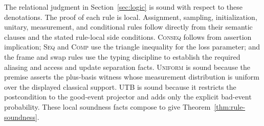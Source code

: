 \documentclass[conference,compsoc]{IEEEtran}
\begin{document}
The relational judgment in Section~\ref{sec:logic} is sound with respect to
these denotations. The proof of each rule is local. Assignment, sampling,
initialization, unitary, measurement, and conditional rules follow directly
from their semantic clauses and the stated rule-local side conditions.
\textsc{Conseq} follows from assertion implication; \textsc{Seq} and
\textsc{Comp} use the triangle inequality for the loss parameter; and the
frame and swap rules use the typing discipline to establish the required
aliasing and access and update separation facts. \textsc{Uniform} is sound because
the premise asserts the plus-basis witness whose measurement distribution is
uniform over the displayed classical support. \textsc{UTB} is sound because it
restricts the postcondition to the good-event projector and adds only the
explicit bad-event probability. These local soundness facts compose to give
Theorem~\ref{thm:rule-soundness}.
\end{document}
